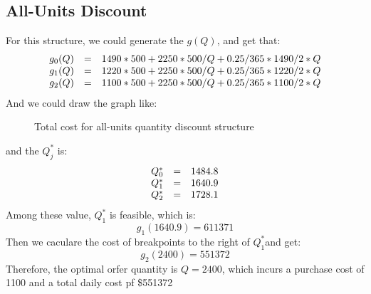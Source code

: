 \documentclass[a4paper,12pt]{journal}
\begin{document}
\subsection*{All-Units Discount}
For this structure, we could generate the $g(Q)$, and get that:
\begin{equation}
	\begin{array}{r c l}
		g_0(Q)&=&1490*500+2250*500/Q+0.25/365*1490/2*Q\\
		g_1(Q)&=&1220*500+2250*500/Q+0.25/365*1220/2*Q\\
		g_2(Q)&=&1100*500+2250*500/Q+0.25/365*1100/2*Q\\
	\end{array}
\end{equation}
And we could draw the graph like:
\begin{figure}[h]
	\caption{Total cost for all-units quantity discount structure}
\end{figure}
and the $Q_j^\ast$ is:
\begin{equation}
	\begin{array}{r c l}
		Q_0^\ast&=&1484.8\\
		Q_1^\ast&=&1640.9\\
		Q_2^\ast&=&1728.1\\
	\end{array}
\end{equation}
Among these value, $Q_1^\ast$ is feasible, which is:
$$g_1(1640.9)=611371$$
Then we caculare the cost of breakpoints to the right of $Q_1^\ast$and get:\\
$$g_2(2400)=551372$$
Therefore, the optimal orfer quantity is $Q=2400$, which incurs a purchase cost of 1100 and a total daily cost pf \$551372
\end{document}
